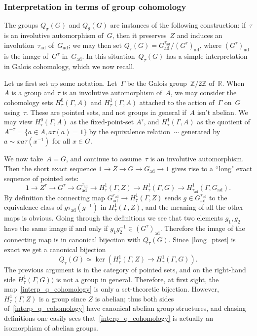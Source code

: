 \documentclass[10pt,leqno]{article}
\newcommand{\ad}{\mathrm{ad}}
\newcommand{\Gad}{G_\mathrm{ad}}
\newcommand{\R}{\mathbb R}
\newcommand{\Z}{\mathbb Z}
\newcommand\inv{^{-1}}
\begin{document}
\subsubsection{Interpretation in terms of group cohomology}

The groups $Q_{\sigma}(G)$ and $Q_{\theta}(G)$ are instances of the following construction: if~$\tau$ is an involutive automorphism of~$G$, then it preserves~$Z$ and induces an involution~$\tau_{\ad}$ of~$\Gad$; we may then set $Q_{\tau}(G)=\Gad^{\tau_{\ad}}/(G^{\tau})_{\ad}$, where $(G^{\tau})_{\ad}$ is the image of~$G^{\tau}$ in~$\Gad$. In this situation~$Q_{\tau}(G)$ has a simple interpretation in Galois cohomology, which we now recall. 

Let us first set up some notation. Let~$\Gamma$ be the Galois group~$\Z/2\Z$ of~$\R$. When~$A$ is a group and $\tau$ is an involutive automorphism of~$A$, we may consider the cohomology sets $H^0_\tau(\Gamma, A)$ and $H^1_\tau(\Gamma, A)$ attached to the action of~$\Gamma$ on~$G$ using~$\tau$.  These are pointed sets, and not groups in general if~$A$ isn't abelian. We may view $H^0_\tau(\Gamma, A)$ as the fixed-point-set $A^{\tau}$, and $H^1_\tau(\Gamma,A)$ as the quotient of $A^{-\tau} = \{ a \in A, a\tau(a)=1\}$ by the equivalence relation~$\sim$ generated by $a \sim x a \tau(x^{-1})$ for all $x \in G$. 


We now take~$A=G$, and continue to assume~$\tau$ is an involutive automorphism. Then the short exact sequence $1\rightarrow Z \rightarrow G \rightarrow \Gad\rightarrow 1$ 
gives rise to a ``long" exact sequence of pointed sets:
\begin{equation} \label{long_ptset}
1\rightarrow Z^\tau \rightarrow G^\tau \rightarrow \Gad^{\tau_{\ad}} \rightarrow H^1_\tau(\Gamma,Z)\rightarrow H^1_\tau(\Gamma,G)\rightarrow H^1_{\tau_\ad}(\Gamma,\Gad).
\end{equation}
By definition the connecting map  $ \Gad^{\tau_{\ad}} \rightarrow H^1_\tau(\Gamma,Z)$ sends $g \in \Gad^{\tau_{\ad}}$ to the equivalence class of $g \tau_{\ad}(g^{-1})$ in $H^1_\tau(\Gamma, Z)$, and the meaning of all the other maps is obvious. 
Going through the definitions we see that  two elements  $g_1, g_2$ have the same image if and only if $g_1 g_{2}\inv \in (G^\tau)_{\ad}$. 
Therefore the image of the connecting map is in canonical bijection with $Q_\tau(G)$. Since~\eqref{long_ptset} is exact we get a canonical bijection
\begin{equation} \label{interp_q_cohomology} Q_{\tau}(G) \simeq \ker(H^1_\tau(\Gamma,Z)\rightarrow H^1_\tau(\Gamma,G)).\end{equation}
The previous argument is in the category of pointed sets, and on the right-hand side $H^1_\tau(\Gamma,G))$  is not a group in general. Therefore, at first sight, the map~\eqref{interp_q_cohomology} is only a set-theoretic bijection. However, 
$H^1_\tau(\Gamma,Z)$ is a group since $Z$ is abelian; thus both sides of~\eqref{interp_q_cohomology} have canonical abelian group structures, and chasing definitions one easily sees that~\eqref{interp_q_cohomology} is actually an isomorphism of abelian groups.
 
\end{document}
